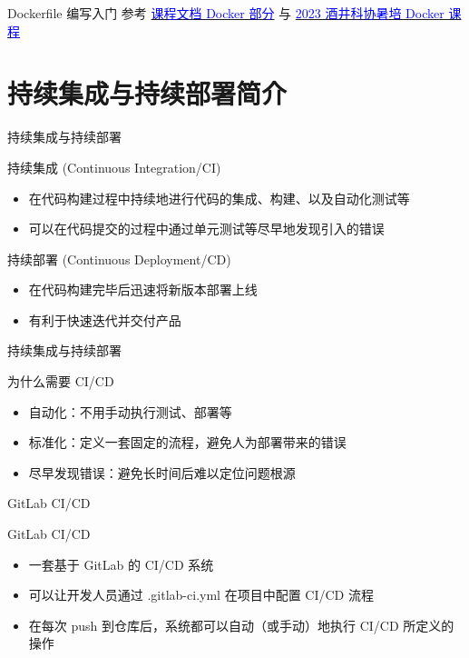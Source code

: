 \documentclass{beamer}
\begin{document}
\begin{frame}{Dockerfile 编写入门}
参考 \href{https://thuse-course.github.io/course-index/deploy/docker/}{\textcolor{blue}{课程文档 Docker 部分}} 与 \href{https://summer23.net9.org/sast2023-docker/}{\textcolor{blue}{2023 酒井科协暑培 Docker 课程}}
\end{frame}

\section{持续集成与持续部署简介}

\begin{frame}{持续集成与持续部署}
    \begin{block}{持续集成 (Continuous Integration/CI)}
        \begin{itemize}
            \item 在代码构建过程中持续地进行代码的集成、构建、以及自动化测试等
            \item 可以在代码提交的过程中通过单元测试等尽早地发现引入的错误
        \end{itemize}
    \end{block}
    
    \begin{block}{持续部署 (Continuous Deployment/CD)}
        \begin{itemize}
            \item 在代码构建完毕后迅速将新版本部署上线
            \item 有利于快速迭代并交付产品
        \end{itemize}
    \end{block}
\end{frame}

\begin{frame}{持续集成与持续部署}
    \begin{block}{为什么需要 CI/CD}
        \begin{itemize}
            \item 自动化：不用手动执行测试、部署等
            \item 标准化：定义一套固定的流程，避免人为部署带来的错误
            \item 尽早发现错误：避免长时间后难以定位问题根源
        \end{itemize}
    \end{block}
\end{frame}

\begin{frame}{GitLab CI/CD}
    \begin{block}{GitLab CI/CD}
        \begin{itemize}
            \item 一套基于 GitLab 的 CI/CD 系统
            \item 可以让开发人员通过 .gitlab-ci.yml 在项目中配置 CI/CD 流程
            \item 在每次 push 到仓库后，系统都可以自动（或手动）地执行 CI/CD 所定义的操作
        \end{itemize}
    \end{block}
\end{frame}
\end{document}
